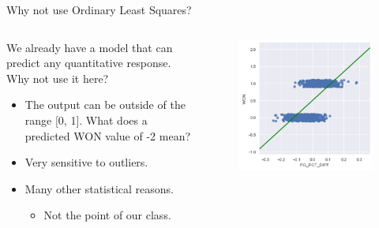 \documentclass[aspectratio=169]{../latex_main/tntbeamer}  %
\begin{document}
	
	\begin{frame}{Why not use Ordinary Least Squares?}
	    \begin{columns}
	        \begin{column}{.4\textwidth}
	                We already have a model that can predict any quantitative response. Why not use it here?
	                \begin{itemize}
	                    \item The output can be outside of the range [0, 1]. What does a predicted WON value of -2 mean?
	                    \item Very sensitive to outliers.
	                    \item Many other statistical reasons.
	                    \begin{itemize}
	                        \item Not the point of our class.
	                    \end{itemize}
	                \end{itemize}
	        \end{column}
	        
	        \begin{column}{.4\textwidth}
	                \begin{figure}
	                    \includegraphics[scale=.5]{Bild4}
	                \end{figure}
	        \end{column}
	    \end{columns}
	\end{frame}
	
\end{document}

